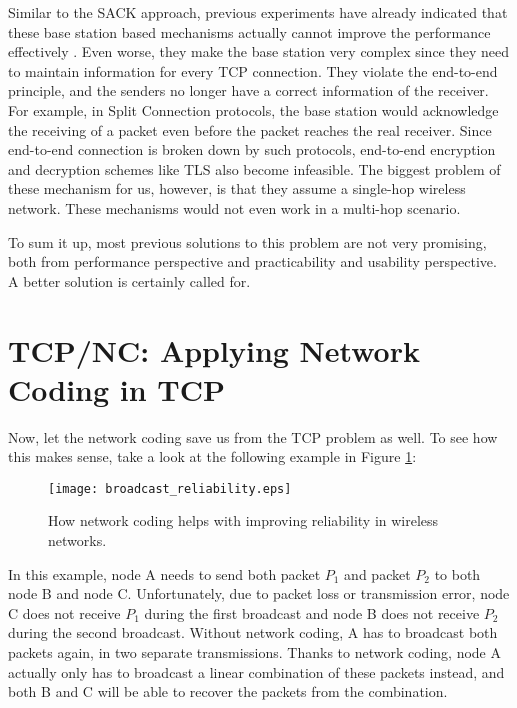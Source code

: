 \documentclass[10pt, conference, final, letterpaper]{IEEEtran}
\theoremstyle{definition}
\begin{document}
Similar to the SACK approach, previous experiments have already indicated that these base station based mechanisms actually cannot improve the performance effectively \cite{TCPWireless}. Even worse, they make the base station very complex since they need to maintain information for every TCP connection. They violate the end-to-end principle, and the senders no longer have a correct information of the receiver. For example, in Split Connection protocols, the base station would acknowledge the receiving of a packet even before the packet reaches the real receiver. Since end-to-end connection is broken down by such protocols, end-to-end encryption and decryption schemes like TLS \cite{TLS-RFC} also become infeasible. 
The biggest problem of these mechanism for us, however, is that they assume a single-hop wireless network. These mechanisms would not even work in a multi-hop scenario.

To sum it up, most previous solutions to this problem are not very promising, both from performance perspective and practicability and usability perspective. A better solution is certainly called for. 

\section{TCP/NC: Applying Network Coding in TCP}
\label{sec:TCPNC}

Now, let the network coding save us from the TCP problem as well. To see how this makes sense, take a look at the following example in Figure \ref{fig:reliability}: 

\begin{figure}[hbt]
	\begin{center}
		\texttt{[image: broadcast\_reliability.eps]}
	\end{center}
	\caption{How network coding helps with improving reliability in wireless networks. \cite{TCPNC}}
	\label{fig:reliability}
\end{figure}

In this example, node A needs to send both packet $P_{1}$ and packet $P_{2}$ to both node B and node C. Unfortunately, due to packet loss or transmission error, node C does not receive $P_{1}$ during the first broadcast and node B does not receive $P_{2}$ during the second broadcast. Without network coding, A has to broadcast both packets again, in two separate transmissions. Thanks to network coding, node A actually only has to broadcast a linear combination of these packets instead, and both B and C will be able to recover the packets from the combination.
\end{document}

